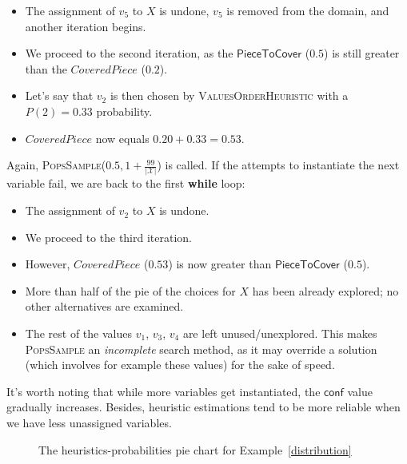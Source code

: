 \documentclass{ws-ijait}
\begin{document}
\begin{example}
\begin{itemize}
    \item The assignment of $v_5$ to $X$ is undone, $v_5$ is
          removed from the domain, and another iteration
          begins.
    \item We proceed to the second iteration, as the
          $\mathsf{PieceToCover}$ ($0.5$) is still greater
          than the $\mathit{CoveredPiece}$ ($0.2$).
    \item Let's say that $v_2$ is then chosen by
          \textsc{ValuesOrderHeuristic} with a $P(2) = 0.33$
          probability.
    \item $\mathit{CoveredPiece}$ now equals $0.20 + 0.33 =
          0.53$.
  \end{itemize}
  Again, \textsc{PopsSample}($0.5, 1 +
  \frac{99}{|\mathscr{X}|}$) is called. If the attempts to
  instantiate the next variable fail, we are back to the
  first \textbf{while} loop:
  \begin{itemize}
    \item The assignment of $v_2$ to $X$ is undone.
    \item We proceed to the third iteration.
    \item However, $\mathit{CoveredPiece}$ ($0.53$) is now
          greater than $\mathsf{PieceToCover}$ ($0.5$).
    \item More than half of the pie of the choices for $X$
          has been already explored; no other alternatives
          are examined.
    \item The rest of the values $v_1$, $v_3$, $v_4$ are
          left unused\slash unexplored. This makes
          \textsc{PopsSample} an \emph{incomplete} search
          method, as it may override a solution (which
          involves for example these values) for the sake of
          speed.
  \end{itemize}
\end{example}
It's worth noting that while more variables get
instantiated, the $\mathsf{conf}$ value gradually increases.
Besides, heuristic estimations tend to be more reliable when
we have less unassigned variables.

\begin{figure}
  \centering
  
  \caption{The heuristics-probabilities pie chart for
           Example~\ref{distribution}\label{piechart}}
\end{figure}
\end{document}
